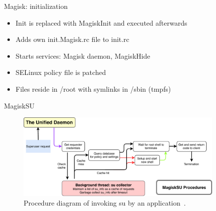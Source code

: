 \documentclass[
    11pt,%
    aspectratio=169,%
]{beamer}
\begin{document}
\begin{frame}[fragile]{Magisk: initialization}
\begin{itemize}
  \item Init is replaced with MagiskInit and executed afterwards\newline
  \item Adds own init.Magisk.rc file to init.rc\newline
  \item Starts services: Magisk daemon, MagiskHide\newline
  \item SELinux policy file is patched\newline
  \item Files reside in /root with symlinks in /sbin (tmpfs)
\end{itemize}

\end{frame}







\begin{frame}{MagiskSU}
\begin{figure}
	\centering
	\includegraphics[width=0.9\textwidth]{img/magisk_su_procedures}
	\caption{Procedure diagram of invoking su by an application~\cite{magisk_documentation}.}
	\label{fig:magisk_su_procedures_diagram}
\end{figure}
\end{frame}
\end{document}
